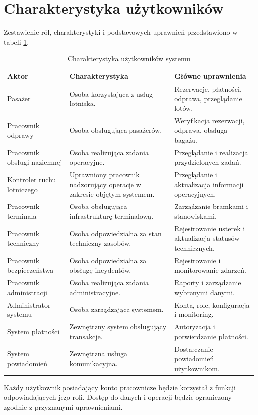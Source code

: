 \documentclass[12pt,a4paper,oneside]{report}
\begin{document}
\section{Charakterystyka użytkowników}
Zestawienie ról, charakterystyki i podstawowych uprawnień przedstawiono w tabeli \ref{tab:aktorzy}.
\begin{longtable}{|p{3.6cm}|p{5.1cm}|p{5cm}|}
\caption{Charakterystyka użytkowników systemu}\label{tab:aktorzy}\\\hline
\rowcolor{lightblue}\textbf{Aktor} & \textbf{Charakterystyka} & \textbf{Główne uprawnienia}\\\hline
Pasażer & Osoba korzystająca z usług lotniska. & Rezerwacje, płatności, odprawa, przeglądanie lotów.\\\hline
Pracownik odprawy & Osoba obsługująca pasażerów. & Weryfikacja rezerwacji, odprawa, obsługa bagażu.\\\hline
Pracownik obsługi naziemnej & Osoba realizująca zadania operacyjne. & Przeglądanie i realizacja przydzielonych zadań.\\\hline
Kontroler ruchu lotniczego & Uprawniony pracownik nadzorujący operacje w zakresie objętym systemem. & Przeglądanie i aktualizacja informacji operacyjnych.\\\hline
Pracownik terminala & Osoba obsługująca infrastrukturę terminalową. & Zarządzanie bramkami i stanowiskami.\\\hline
Pracownik techniczny & Osoba odpowiedzialna za stan techniczny zasobów. & Rejestrowanie usterek i aktualizacja statusów technicznych.\\\hline
Pracownik bezpieczeństwa & Osoba odpowiedzialna za obsługę incydentów. & Rejestrowanie i monitorowanie zdarzeń.\\\hline
Pracownik administracji & Osoba realizująca zadania administracyjne. & Raporty i zarządzanie wybranymi danymi.\\\hline
Administrator systemu & Osoba zarządzająca systemem. & Konta, role, konfiguracja i monitoring.\\\hline
System płatności & Zewnętrzny system obsługujący transakcje. & Autoryzacja i potwierdzanie płatności.\\\hline
System powiadomień & Zewnętrzna usługa komunikacyjna. & Dostarczanie powiadomień użytkownikom.\\\hline
\end{longtable}

Każdy użytkownik posiadający konto pracownicze będzie korzystał z funkcji odpowiadających jego roli. Dostęp do danych i operacji będzie ograniczony zgodnie z przyznanymi uprawnieniami.
\end{document}
